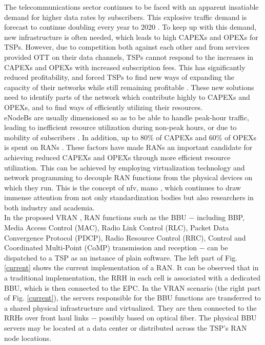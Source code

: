 \documentclass[conference]{IEEEtran}
\begin{document}
The telecommunications sector continues to be faced with an apparent insatiable demand for higher data rates by subscribers. This explosive traffic demand is forecast to continue doubling every year to 2020 \cite{nfv}. To keep up with this demand, new infrastructure is often needed, which leads to high \acp{CAPEX} and \acp{OPEX} for \acp{TSP}. However, due to competition both against each other and from services provided \ac{OTT} on their data channels, \acp{TSP} cannot respond to the increases in \acp{CAPEX} and \acp{OPEX} with increased subscription fees. This has significantly reduced profitability, and forced \acp{TSP} to find new ways of expanding the capacity of their networks while still remaining profitable \cite{MijumbiNFV15}. These new solutions need to identify parts of the network which contribute highly to \acp{CAPEX} and \acp{OPEX}, and to find ways of efficiently utilizing their resources.\\
\indent \acp{eNodeB} are usually dimensioned so as to be able to handle peak-hour traffic, leading to inefficient resource utilization during non-peak hours, or due to mobility of subscribers \cite{ChinaMobile}. In addition, up to 80\% of \acp{CAPEX} and 60\% of \acp{OPEX} is spent on \acp{RAN} \cite{ChinaMobile}. These factors have made \acp{RAN} an important candidate for achieving reduced \acp{CAPEX} and \acp{OPEX} through more efficient resource utilization. This can be achieved by employing virtualization technology and network programming to decouple \ac{RAN} functions from the physical devices on which they run. This is the concept of \ac{nfv, mano} \cite{MijumbiNFV15}, which continues to draw immense attention from not only standardization bodies but also researchers in both industry and academia.\\
\indent In the proposed \ac{VRAN} \cite{ETSIUseCases}, \ac{RAN} functions such as the \ac{BBU} $-$ including \ac{BBP}, Media Access Control (MAC), Radio Link Control (RLC), Packet Data Convergence Protocol (PDCP), Radio Resource Control (RRC), Control and Coordinated Multi-Point (CoMP) transmission and reception $-$ can be dispatched to a \ac{TSP} as an instance of plain software. The left part of Fig. \ref{current} shows the current implementation of a \ac{RAN}. It can be observed that in a traditional implementation, the \ac{RRH} in each cell is associated with a dedicated \ac{BBU}, which is then connected to the \ac{EPC}. In the \ac{VRAN} scenario (the right part of Fig. \ref{current}), the servers responsible for the \ac{BBU} functions are transferred to a shared physical infrastructure and virtualized. They are then connected to the \acp{RRH} over front haul links $-$ possibly based on optical fiber. The physical \ac{BBU} servers may be located at a data center or distributed across the \ac{TSP}'s \ac{RAN} node locations.\\
\end{document}
